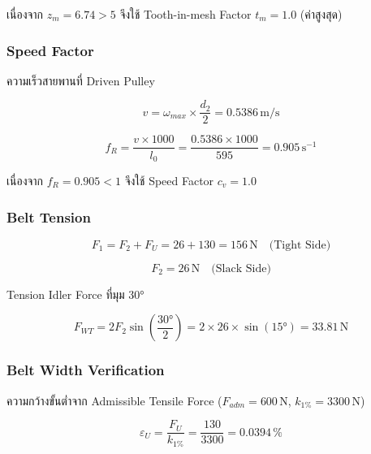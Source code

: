 เนื่องจาก $z_m = 6.74 > 5$ จึงใช้ Tooth-in-mesh Factor
$t_m = 1.0$ (ค่าสูงสุด)

\subsubsection{Speed Factor}

ความเร็วสายพานที่ Driven Pulley

\begin{equation}
  v = \omega_{max} \times \frac{d_2}{2}
    = 0.5386\,\text{m/s}
  \label{eq:belt_speed}
\end{equation}

\begin{equation}
  f_R = \frac{v \times 1000}{l_0}
      = \frac{0.5386 \times 1000}{595}
      = 0.905\,\text{s}^{-1}
  \label{eq:belt_fr}
\end{equation}

เนื่องจาก $f_R = 0.905 < 1$ จึงใช้ Speed Factor
$c_v = 1.0$

\subsubsection{Belt Tension}

\begin{equation}
  F_1 = F_2 + F_U = 26 + 130 = 156\,\text{N}
  \quad \text{(Tight Side)}
  \label{eq:belt_f1}
\end{equation}

\begin{equation}
  F_2 = 26\,\text{N}
  \quad \text{(Slack Side)}
  \label{eq:belt_f2}
\end{equation}

Tension Idler Force ที่มุม 30°

\begin{equation}
  F_{WT} = 2 F_2 \sin\left(\frac{30°}{2}\right)
         = 2 \times 26 \times \sin(15°)
         = 33.81\,\text{N}
  \label{eq:belt_fwt}
\end{equation}

\subsubsection{Belt Width Verification}

ความกว้างขั้นต่ำจาก Admissible Tensile Force
($F_{adm} = 600\,\text{N}$, $k_{1\%} = 3300\,\text{N}$)

\begin{equation}
  \varepsilon_U = \frac{F_U}{k_{1\%}}
               = \frac{130}{3300}
               = 0.0394\,\%
  \label{eq:belt_strain}
\end{equation}

